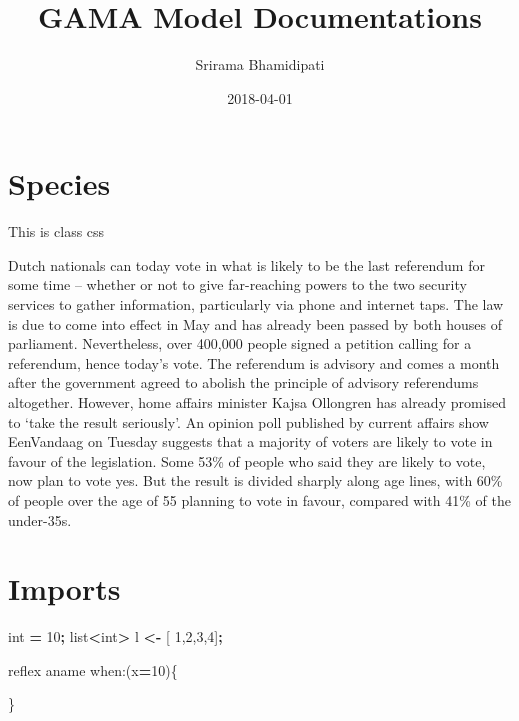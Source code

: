 \documentclass[]{book}
\title{GAMA Model Documentations}
\author{Srirama Bhamidipati}
\date{2018-04-01}
\newenvironment{Shaded}{\begin{snugshade}}{\end{snugshade}}
\newcommand{\DecValTok}[1]{\textcolor[rgb]{0.00,0.00,0.81}{#1}}
\newcommand{\OperatorTok}[1]{\textcolor[rgb]{0.81,0.36,0.00}{\textbf{#1}}}
\newcommand{\BuiltInTok}[1]{#1}
\newcommand{\NormalTok}[1]{#1}
\begin{document}
\maketitle

{
\setcounter{tocdepth}{1}
\tableofcontents
}
\chapter{Species}\label{species}

 This is class css

Dutch nationals can today vote in what is likely to be the last
referendum for some time -- whether or not to give far-reaching powers
to the two security services to gather information, particularly via
phone and internet taps. The law is due to come into effect in May and
has already been passed by both houses of parliament. Nevertheless, over
400,000 people signed a petition calling for a referendum, hence today's
vote. The referendum is advisory and comes a month after the government
agreed to abolish the principle of advisory referendums altogether.
However, home affairs minister Kajsa Ollongren has already promised to
`take the result seriously'. An opinion poll published by current
affairs show EenVandaag on Tuesday suggests that a majority of voters
are likely to vote in favour of the legislation. Some 53\% of people who
said they are likely to vote, now plan to vote yes. But the result is
divided sharply along age lines, with 60\% of people over the age of 55
planning to vote in favour, compared with 41\% of the under-35s.

\chapter{Imports}\label{imports}

\begin{Shaded}
\begin{Highlighting}[]
\BuiltInTok{int} \OperatorTok{=} \DecValTok{10}\OperatorTok{;}
\BuiltInTok{list}\OperatorTok{<}\BuiltInTok{int}\OperatorTok{>}\NormalTok{ l }\OperatorTok{<-}\NormalTok{ [ }\DecValTok{1}\NormalTok{,}\DecValTok{2}\NormalTok{,}\DecValTok{3}\NormalTok{,}\DecValTok{4}\NormalTok{]}\OperatorTok{;}

\NormalTok{reflex aname when:(x}\OperatorTok{=}\DecValTok{10}\NormalTok{)\{}

\NormalTok{\}}
\end{Highlighting}
\end{Shaded}
\end{document}
